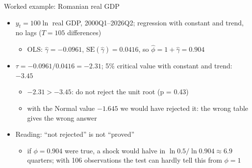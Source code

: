 \begin{frame}{Worked example: Romanian real GDP}
\itemsize{\small}
\begin{itemize}
    \item $y_t = 100\ln$ real GDP, 2000Q1--2026Q2; regression with constant and trend, no lags ($T = 105$ differences)
    \begin{itemize}
        \item OLS: $\hat\gamma = \ensuremath{-}0.0961$, $\mathrm{SE}(\hat\gamma) = 0.0416$, so $\hat\phi = 1 + \hat\gamma = 0.904$
    \end{itemize}
    \item $\tau = \ensuremath{-}0.0961/0.0416 = \ensuremath{-}2.31$; 5\% critical value with constant and trend: $\ensuremath{-}3.45$
    \begin{itemize}
        \item $\ensuremath{-}2.31 > \ensuremath{-}3.45$: do not reject the unit root (p = 0.43)
        \item with the Normal value $-1.645$ we would have rejected it: the wrong table gives the wrong answer
    \end{itemize}
    \item Reading: ``not rejected'' is not ``proved''
    \begin{itemize}
        \item if $\phi = 0.904$ were true, a shock would halve in $\ln 0.5/\ln 0.904 \approx 6.9$ quarters; with 106 observations the test can hardly tell this from $\phi = 1$
    \end{itemize}
\end{itemize}
\end{frame}

